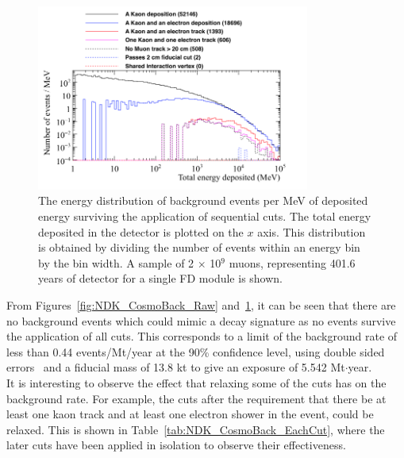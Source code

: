 \begin{figure}
  \centering
  \includegraphics[width=0.8\textwidth]{CosmicBackground_EnergyDepCuts_Norm_2cmCut}
  \caption[The energy distribution of background events per MeV of deposited energy surviving the application of sequential cuts]
          {The energy distribution of background events per MeV of deposited energy surviving the application of sequential cuts. The total energy deposited in the detector is plotted on the $x$ axis. This distribution is obtained by dividing the number of events within an energy bin by the bin width. A sample of 2 $\times$ 10$^9$ muons, representing 401.6 years of detector for a single FD module is shown.}
  \label{fig:NDK_CosmoBack_Norm}
\end{figure}

From Figures~\ref{fig:NDK_CosmoBack_Raw} and~\ref{fig:NDK_CosmoBack_Norm}, it can be seen that there are no background events which could mimic a decay signature as no events survive the application of all cuts. This corresponds to a limit of the background rate of less than 0.44 events/Mt/year at the 90\% confidence level, using double sided errors~\citep{PDGReview} and a fiducial mass of 13.8 kt to give an exposure of 5.542 Mt$\cdot$year. \\

It is interesting to observe the effect that relaxing some of the cuts has on the background rate. For example, the cuts after the requirement that there be at least one kaon track and at least one electron shower in the event, could be relaxed. This is shown in Table~\ref{tab:NDK_CosmoBack_EachCut}, where the later cuts have been applied in isolation to observe their effectiveness. \\

